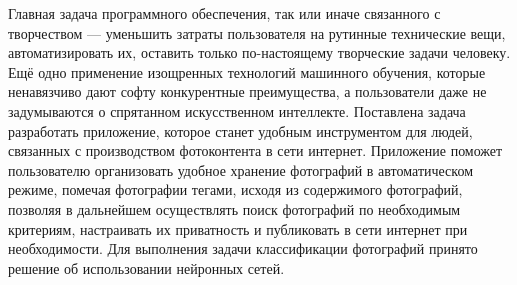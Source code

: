 Главная задача программного обеспечения, так или иначе связанного с творчеством — уменьшить затраты пользователя на рутинные технические вещи, автоматизировать их, оставить только по-настоящему творческие задачи человеку.
Ещё одно применение изощренных технологий машинного обучения, которые ненавязчиво дают софту конкурентные преимущества, а пользователи даже не задумываются о спрятанном искусственном интеллекте.
Поставлена задача разработать приложение, которое станет удобным инструментом для людей, связанных с производством фотоконтента в сети интернет. Приложение поможет пользователю организовать удобное хранение фотографий в автоматическом режиме, помечая фотографии тегами, исходя из содержимого фотографий, позволяя в дальнейшем осуществлять поиск фотографий по необходимым критериям, настраивать их приватность и публиковать в сети интернет при необходимости. Для выполнения задачи классификации фотографий принято решение об использовании нейронных сетей.

\clearpage